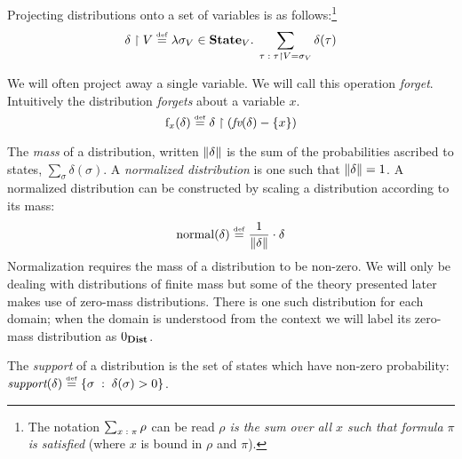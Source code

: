 Projecting distributions onto a set of variables is as
follows:\footnote{The notation $\sum_{x \;:\; \pi} \rho$ can be read
  \emph{$\rho$ is the sum over all $x$ such that formula $\pi$ is
    satisfied} (where $x$ is bound in $\rho$ and $\pi$).}
\[\delta \upharpoonright V \stackrel{\smash{\scriptscriptstyle \mathrm{def}}}= \lambda \sigma_V \in \textbf{State}_V . \; \sum_{\tau \;:\; \tau \upharpoonright V = \sigma_V} \delta(\tau)\]

We will often project away a single variable. We will call this
operation \emph{forget}. Intuitively the distribution \emph{forgets}
about a variable $ x $.
$$ \mathrm{f}_{x}(\delta) \stackrel{\smash{\scriptscriptstyle \mathrm{def}}}= \delta \upharpoonright \left( \textit{fv}(\delta) -
    \left\{ x \right\} \right) $$

The \emph{mass} of a distribution, written $ \mathord{\parallel}\delta\mathord{\parallel} $ is the sum
of the probabilities ascribed to states, $ \sum_{\sigma}
\delta(\sigma) $.  A \emph{normalized distribution} is one such that $
\mathord{\parallel}\delta\mathord{\parallel} = 1 $.  A normalized distribution can 
be constructed by scaling a distribution according to its
mass:
$$ \text{normal}(\delta) \stackrel{\smash{\scriptscriptstyle \mathrm{def}}}= \frac{1}{\mathord{\parallel}\delta\mathord{\parallel}} \cdot \delta $$
Normalization requires the mass of a distribution to be non-zero. We
will only be dealing with distributions of finite mass but some of the
theory presented later makes use of zero-mass
distributions. There is one such distribution for each domain; when
the domain is understood from the context we will label its zero-mass
distribution as $ 0_{\textbf{Dist}}{} $.

The \emph{support} of a distribution is the set of states which have
non-zero probability: $\textit{support}(\delta) \stackrel{\smash{\scriptscriptstyle \mathrm{def}}}= \{\sigma \;:\;
\delta(\sigma) > 0\}$.


